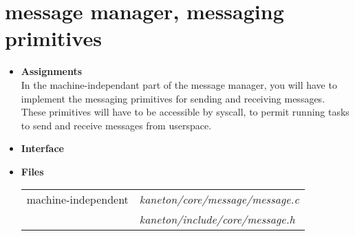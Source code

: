 \newpage

\section{message manager, \textbf{messaging primitives}}

\begin{itemize}
  \item {\bf Assignments}\\

  In the machine-independant part of the message manager, you will have to
  implement the messaging primitives for sending and receiving messages.
  These primitives will have to be accessible by syscall, to permit
  running tasks to send and receive messages from userspace.

  \item {\bf Interface}\\

	 {

	 }

	 {

	 }

	 {

	 }

	 {

	 }




  \item {\bf {Files}}\\

    \begin{tabular}{| l | l |}
      \hline
      machine-independent & {\em kaneton/core/message/message.c}\\
      &  {\em kaneton/include/core/message.h}\\\hline
    \end{tabular}
\end{itemize}

